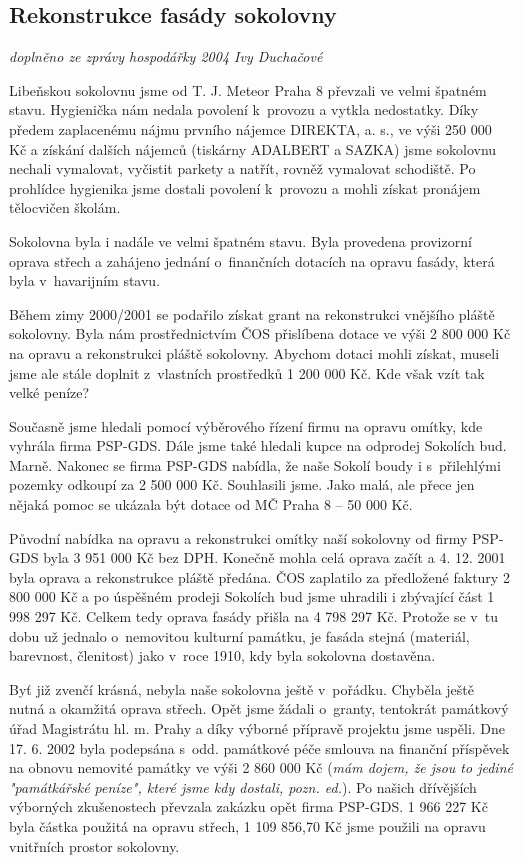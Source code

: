 \documentclass[a5paper, 11pt, twoside]{article}
\begin{document}
\subsection{Rekonstrukce fasády
sokolovny}

\textit{doplněno ze zprávy hospodářky 2004 Ivy Duchačové}

Libeňskou sokolovnu jsme od T. J. Meteor Praha 8 převzali ve velmi
špatném stavu. Hygienička nám nedala povolení k~provozu a vytkla
nedostatky. Díky předem zaplacenému nájmu prvního nájemce DIREKTA, a.
s., ve výši 250 000 Kč a získání dalších nájemců (tiskárny ADALBERT a
SAZKA) jsme sokolovnu nechali vymalovat, vyčistit parkety a natřít,
rovněž vymalovat schodiště. Po prohlídce hygienika jsme dostali povolení
k~provozu a mohli získat pronájem tělocvičen školám.

Sokolovna byla i nadále ve velmi špatném stavu. Byla provedena
provizorní oprava střech a zahájeno jednání o~finančních dotacích na
opravu fasády, která byla v~havarijním stavu.

Během zimy 2000/2001 se podařilo získat grant na rekonstrukci vnějšího
pláště sokolovny. Byla nám prostřednictvím ČOS přislíbena dotace ve výši
2 800 000 Kč na opravu a rekonstrukci pláště sokolovny. Abychom dotaci
mohli získat, museli jsme ale stále doplnit z~vlastních prostředků 1 200
000 Kč. Kde však vzít tak velké peníze?

Současně jsme hledali pomocí výběrového řízení firmu na opravu omítky,
kde vyhrála firma PSP-GDS. Dále jsme také hledali kupce na odprodej
Sokolích bud. Marně. Nakonec se firma PSP-GDS nabídla, že naše Sokolí
boudy i s~přilehlými pozemky odkoupí za 2 500 000 Kč. Souhlasili jsme.
Jako malá, ale přece jen nějaká pomoc se ukázala být dotace od MČ Praha
8 -- 50 000 Kč.

Původní nabídka na opravu a rekonstrukci omítky naší sokolovny od firmy
PSP-GDS byla 3 951 000 Kč bez DPH. Konečně mohla celá oprava začít a 4.
12. 2001 byla oprava a rekonstrukce pláště předána. ČOS zaplatilo za
předložené faktury 2 800 000 Kč a po úspěšném prodeji Sokolích bud jsme
uhradili i zbývající část 1 998 297 Kč. Celkem tedy oprava fasády přišla
na 4 798 297 Kč. Protože se v~tu dobu už jednalo o~nemovitou kulturní
památku, je fasáda stejná (materiál, barevnost, členitost) jako v~roce
1910, kdy byla sokolovna dostavěna.

Byť již zvenčí krásná, nebyla naše sokolovna ještě v~pořádku. Chyběla
ještě nutná a okamžitá oprava střech. Opět jsme žádali o~granty,
tentokrát památkový úřad Magistrátu hl. m. Prahy a díky výborné přípravě
projektu jsme uspěli. Dne 17. 6. 2002 byla podepsána s~odd. památkové
péče smlouva na finanční příspěvek na obnovu nemovité památky ve výši 2
860 000 Kč (\textit{mám dojem, že jsou to jediné "památkářské peníze",
které jsme kdy dostali, pozn. ed.}). Po našich dřívějších výborných
zkušenostech převzala zakázku opět firma PSP-GDS. 1 966 227 Kč byla
částka použitá na opravu střech, 1 109 856,70 Kč jsme použili na opravu
vnitřních prostor sokolovny.
\end{document}
